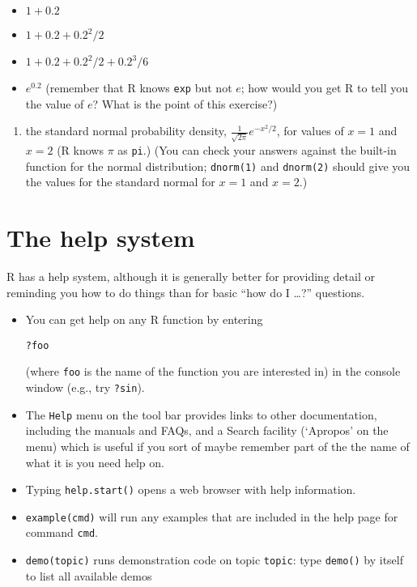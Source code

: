 \documentclass[11pt,]{article}
\providecommand{\tightlist}{%
  \setlength{\itemsep}{0pt}\setlength{\parskip}{0pt}}
\begin{document}
\begin{itemize}
\tightlist
\item
  \(1+0.2\)
\item
  \(1+0.2+0.2^2/2\)
\item
  \(1+0.2+0.2^2/2+0.2^3/6\)
\item
  \(e^{0.2}\) (remember that R knows \texttt{exp} but not \(e\); how
  would you get R to tell you the value of \(e\)? What is the point of
  this exercise?)
\end{itemize}

\begin{enumerate}
\def\labelenumi{\arabic{enumi}.}
\setcounter{enumi}{2}
\tightlist
\item
  the standard normal probability density,
  \(\frac{1}{\sqrt{2 \pi}} e^{-x^2/2}\), for values of \(x=1\) and
  \(x=2\) (R knows \(\pi\) as \texttt{pi}.) (You can check your answers
  against the built-in function for the normal distribution;
  \texttt{dnorm(1)} and \texttt{dnorm(2)} should give you the values for
  the standard normal for \(x=1\) and \(x=2\).)
\end{enumerate}

\section{The help system}\label{the-help-system}

R has a help system, although it is generally better for providing
detail or reminding you how to do things than for basic ``how do I
\ldots{}?'' questions.

\begin{itemize}
\item
  You can get help on any R function by entering

\begin{verbatim}
?foo
\end{verbatim}

  (where \texttt{foo} is the name of the function you are interested in)
  in the console window (e.g., try \texttt{?sin}).
\item
  The \texttt{Help} menu on the tool bar provides links to other
  documentation, including the manuals and FAQs, and a Search facility
  (`Apropos' on the menu) which is useful if you sort of maybe remember
  part of the the name of what it is you need help on.
\item
  Typing \texttt{help.start()} opens a web browser with help
  information.
\item
  \texttt{example(cmd)} will run any examples that are included in the
  help page for command \texttt{cmd}.
\item
  \texttt{demo(topic)} runs demonstration code on topic \texttt{topic}:
  type \texttt{demo()} by itself to list all available demos
\end{itemize}
\end{document}
